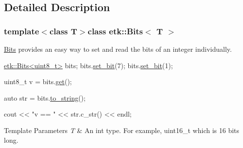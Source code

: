 \subsection{Detailed Description}
\subsubsection*{template$<$class T$>$class etk\-::\-Bits$<$ T $>$}

\hyperlink{classetk_1_1_bits}{Bits} provides an easy way to set and read the bits of an integer individually. 


\begin{DoxyCode}
\hyperlink{classetk_1_1_bits}{etk::Bits<uint8\_t>} bits;
bits.\hyperlink{classetk_1_1_bits_af87f87e0e415962c5b701384f7f76320}{set\_bit}(7);
bits.\hyperlink{classetk_1_1_bits_af87f87e0e415962c5b701384f7f76320}{set\_bit}(1);

uint8\_t v = bits.\hyperlink{classetk_1_1_bits_a3d46dbbf64a5e23d1cf7774c3e13c2ea}{get}();

\textcolor{keyword}{auto} str = bits.\hyperlink{classetk_1_1_bits_a692698877d8fa33a6570750979018274}{to\_string}();

cout << \textcolor{stringliteral}{"v == "} << str.c\_str() << endl;
\end{DoxyCode}



\begin{DoxyTemplParams}{Template Parameters}
{\em T} & An int type. For example, uint16\-\_\-t which is 16 bits long. \\
\hline
\end{DoxyTemplParams}


